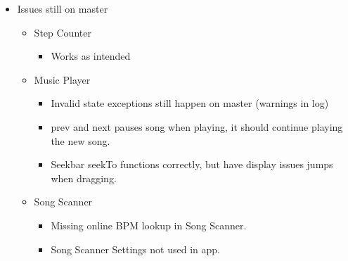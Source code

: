 \begin{itemize}
\item Issues still on master
	\begin{itemize}
	\item Step Counter
		\begin{itemize}
		\item Works as intended
		\end{itemize}
	\end{itemize}
	\begin{itemize}
	\item Music Player
		\begin{itemize}
		\item Invalid state exceptions still happen on master (warnings in log)
		\item prev and next pauses song when playing, it should continue playing the new song.
		\item Seekbar seekTo functions correctly, but have display issues jumps when dragging.
		\end{itemize}
	\end{itemize}
	\begin{itemize}
	\item Song Scanner
		\begin{itemize}
		\item Missing online BPM lookup in Song Scanner.
		\item Song Scanner Settings not used in app.
		\end{itemize}
	\end{itemize}
\end{itemize}

